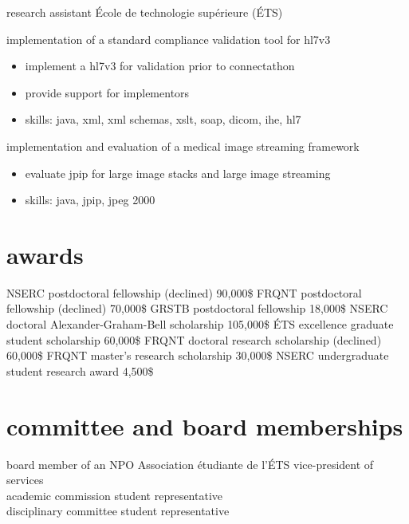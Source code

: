 \documentclass[print]{friggeri-cv}
\begin{document}
\begin{entrylist}
  {research assistant}
  {École de technologie supérieure {\scriptsize (ÉTS)}}
  {implementation of a standard compliance validation tool for hl{\small7}v{\small3}
  \begin{itemize}
    \item implement a hl{\small7}v{\small3} for validation prior to connectathon
    \item provide support for implementors
  \item skills: java, xml, xml schemas, xslt, soap, dicom, ihe, hl7
  \end{itemize}
  implementation and evaluation of a medical image streaming framework
  \begin{itemize}
    \item evaluate jpip for large image stacks and large image streaming
    \item skills: java, jpip, jpeg 2000
  \end{itemize}
  }
\end{entrylist}

\section{awards}
\begin{entrylist}
   {{\small NSERC} postdoctoral fellowship (declined)} {90,000\$} {\vspace{-3mm}}
   {{\small FRQNT} postdoctoral fellowship (declined)} {70,000\$} {\vspace{-3mm}}
   {{\small GRSTB} postdoctoral fellowship} {18,000\$} {\vspace{-3mm}}
   {{\small NSERC} doctoral Alexander-Graham-Bell scholarship} {105,000\$} {\vspace{-3mm}}
   {{\small ÉTS} excellence graduate student scholarship} {60,000\$} {\vspace{-3mm}}
   {{\small FRQNT} doctoral research scholarship (declined)} {60,000\$} {\vspace{-3mm}}
   {{\small FRQNT} master's research scholarship} {30,000\$} {\vspace{-3mm}}
   {{\small NSERC} undergraduate student research award} {4,500\$} {\vspace{-3mm}}
 \end{entrylist}
\vspace{2mm}

\section{committee and board memberships}
\begin{entrylist}
  {board member of an {\small NPO}} {Association étudiante de l'{\scriptsize ÉTS}} {vice-president of services\\ academic commission student representative \\ disciplinary committee student representative}
\end{entrylist}
\end{document}
